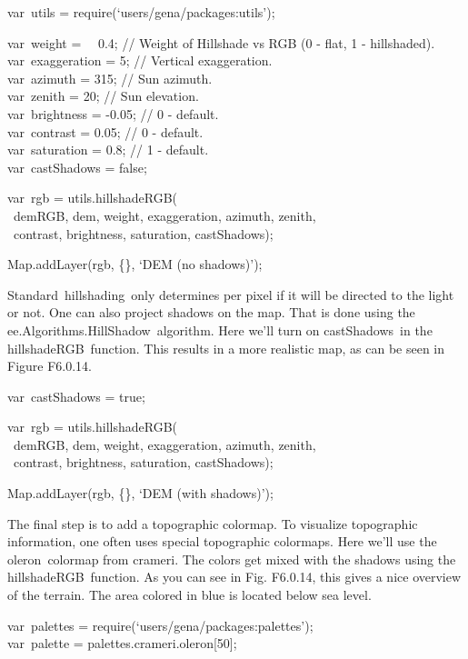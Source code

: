 \documentclass[
  letterpaper,
  DIV=11,
  numbers=noendperiod]{scrreprt}
\begin{document}
var~utils = require(`users/gena/packages:utils');

var~weight =~ ~0.4; // Weight of Hillshade vs RGB (0 - flat, 1 -
hillshaded).\\
var~exaggeration = 5; // Vertical exaggeration.\\
var~azimuth = 315; // Sun azimuth.\\
var~zenith = 20; // Sun elevation.\\
var~brightness = -0.05; // 0 - default.\\
var~contrast = 0.05; // 0 - default.\\
var~saturation = 0.8; // 1 - default.\\
var~castShadows = false;

var~rgb = utils.hillshadeRGB(\\
\hspace*{0.333em} ~demRGB, dem, weight, exaggeration, azimuth, zenith,\\
\hspace*{0.333em} ~contrast, brightness, saturation, castShadows);

Map.addLayer(rgb, \{\}, `DEM (no shadows)');

Standard~hillshading~only determines per pixel if it will be directed to
the light or not. One can also project shadows on the map. That is done
using the ee.Algorithms.HillShadow~algorithm. Here we'll turn on
castShadows~in the hillshadeRGB~function. This results in a more
realistic map, as can be seen in Figure F6.0.14.

var~castShadows = true;

var~rgb = utils.hillshadeRGB(\\
\hspace*{0.333em} ~demRGB, dem, weight, exaggeration, azimuth, zenith,\\
\hspace*{0.333em} ~contrast, brightness, saturation, castShadows);

Map.addLayer(rgb, \{\}, `DEM (with shadows)');

The final step is to add a topographic colormap. To visualize
topographic information, one often uses special topographic colormaps.
Here we'll use the oleron~colormap from crameri. The colors get mixed
with the shadows using the hillshadeRGB~function. As you can see in Fig.
F6.0.14, this gives a nice overview of the terrain. The area colored in
blue is located below sea level.

var~palettes = require(`users/gena/packages:palettes');\\
var~palette = palettes.crameri.oleron{[}50{]};
\end{document}
